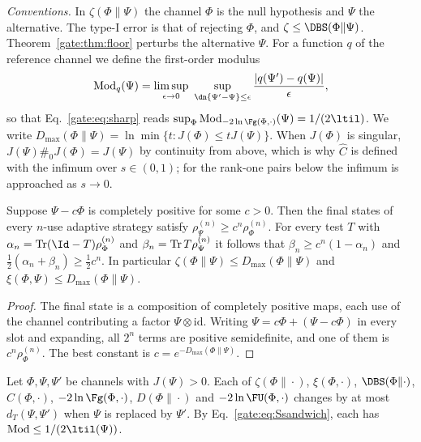 \emph{Conventions.} In $\zeta(\Phi\|\Psi)$ the channel $\Phi$ is the null hypothesis and $\Psi$ the alternative. The type-I error is that of rejecting $\Phi$, and $\zeta\le\DBS(\Phi\|\Psi)$. Theorem~\ref{gate:thm:floor} perturbs the alternative $\Psi$. For a function $q$ of the reference channel we define the first-order modulus
\begin{equation}\label{gate:eq:m1mod}
\mathrm{Mod}_q(\Psi)=\limsup_{\epsilon\to0}\ \sup_{\dn{\Psi'-\Psi}\le\epsilon}\frac{|q(\Psi')-q(\Psi)|}{\epsilon},
\end{equation}
so that Eq.~\eqref{gate:eq:sharp} reads $\sup_\Phi\mathrm{Mod}_{-2\ln\Fg(\Phi,\cdot)}(\Psi)=1/(2\ltil)$. We write $D_{\max}(\Phi\|\Psi)=\ln\min\{t:J(\Phi)\le tJ(\Psi)\}$. When $J(\Phi)$ is singular, $J(\Psi)\#_0J(\Phi)=J(\Psi)$ by continuity from above, which is why $\hat C$ is defined with the infimum over $s\in(0,1)$; for the rank-one pairs below the infimum is approached as $s\to0$.

\begin{lemma}[CP domination]\label{gate:lem:m1dom}
Suppose $\Psi-c\Phi$ is completely positive for some $c>0$. Then the final states of every $n$-use adaptive strategy satisfy $\rho^{(n)}_\Psi\ge c^n\rho^{(n)}_\Phi$. For every test $T$ with $\alpha_n=\Tr(\Id-T)\rho^{(n)}_\Phi$ and $\beta_n=\operatorname{Tr} T\rho^{(n)}_\Psi$ it follows that $\beta_n\ge c^n(1-\alpha_n)$ and $\frac12(\alpha_n+\beta_n)\ge\frac12c^n$. In particular $\zeta(\Phi\|\Psi)\le D_{\max}(\Phi\|\Psi)$ and $\xi(\Phi,\Psi)\le D_{\max}(\Phi\|\Psi)$.
\end{lemma}

\begin{proof}
The final state is a composition of completely positive maps, each use of the channel contributing a factor $\Psi\otimes\mathrm{id}$. Writing $\Psi=c\Phi+(\Psi-c\Phi)$ in every slot and expanding, all $2^n$ terms are positive semidefinite, and one of them is $c^n\rho^{(n)}_\Phi$. The best constant is $c=e^{-D_{\max}(\Phi\|\Psi)}$.
\end{proof}

\begin{proposition}\label{gate:prop:m1thompson}
Let $\Phi,\Psi,\Psi'$ be channels with $J(\Psi)>0$. Each of $\zeta(\Phi\|\cdot)$, $\xi(\Phi,\cdot)$, $\DBS(\Phi\|\cdot)$, $\hat C(\Phi,\cdot)$, $-2\ln\Fg(\Phi,\cdot)$, $D(\Phi\|\cdot)$ and $-2\ln \FU(\Phi,\cdot)$ changes by at most $d_T(\Psi,\Psi')$ when $\Psi$ is replaced by $\Psi'$. By Eq.~\eqref{gate:eq:Ssandwich}, each has $\mathrm{Mod}\le1/(2\ltil(\Psi))$.
\end{proposition}

